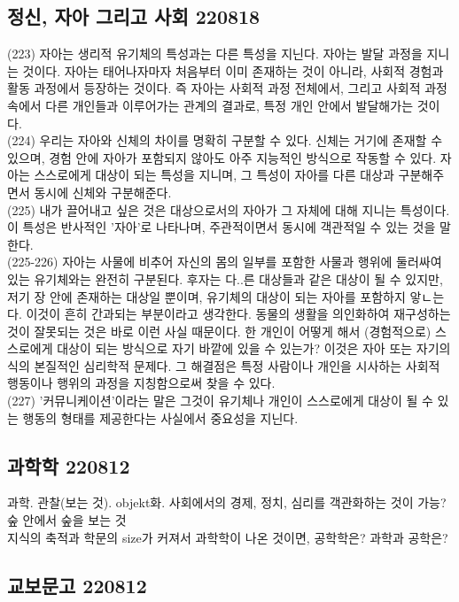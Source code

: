 \documentclass[11pt, a4paper]{article}
\begin{document}
\subsection{정신, 자아 그리고 사회 220818}
(223) 자아는 생리적 유기체의 특성과는 다른 특성을 지닌다. 자아는 발달 과정을 지니는 것이다. 자아는 태어나자마자 처음부터 이미 존재하는 것이 아니라, 사회적 경험과 활동 과정에서 등장하는 것이다. 즉 자아는 사회적 과정 전체에서, 그리고 사회적 과정 속에서 다른 개인들과 이루어가는 관계의 결과로, 특정 개인 안에서 발달해가는 것이다. \\
(224) 우리는 자아와 신체의 차이를 명확히 구분할 수 있다. 신체는 거기에 존재할 수 있으며, 경험 안에 자아가 포함되지 않아도 아주 지능적인 방식으로 작동할 수 있다. 자아는 스스로에게 대상이 되는 특성을 지니며, 그 특성이 자아를 다른 대상과 구분해주면서 동시에 신체와 구분해준다. \\
(225) 내가 끌어내고 싶은 것은 대상으로서의 자아가 그 자체에 대해 지니는 특성이다. 이 특성은 반사적인 '자아'로 나타나며, 주관적이면서 동시에 객관적일 수 있는 것을 말한다. \\
(225-226) 자아는 사물에 비추어 자신의 몸의 일부를 포함한 사물과 행위에 둘러싸여 있는 유기체와는 완전히 구분된다. 후자는 다..른 대상들과 같은 대상이 될 수 있지만, 저기 장 안에 존재하는 대상일 뿐이며, 유기체의 대상이 되는 자아를 포함하지 앟ㄴ는다. 이것이 흔히 간과되는 부분이라고 생각한다. 동물의 생활을 의인화하여 재구성하는 것이 잘못되는 것은 바로 이런 사실 때문이다. 한 개인이 어떻게 해서 (경험적으로) 스스로에게 대상이 되는 방식으로 자기 바깥에 있을 수 있는가? 이것은 자아 또는 자기의식의 본질적인 심리학적 문제다. 그 해결점은 특정 사람이나 개인을 시사하는 사회적 행동이나 행위의 과정을 지칭함으로써 찾을 수 있다. \\
(227) '커뮤니케이션'이라는 말은 그것이 유기체나 개인이 스스로에게 대상이 될 수 있는 행동의 형태를 제공한다는 사실에서 중요성을 지닌다.

\newpage
\subsection{과학학 220812}
과학. 관찰(보는 것). objekt화. 사회에서의 경제, 정치, 심리를 객관화하는 것이 가능? 숲 안에서 숲을 보는 것 \\

지식의 축적과 학문의 size가 커져서 과학학이 나온 것이면, 공학학은? 과학과 공학은? \\


\newpage
\subsection{교보문고 220812}
\end{document}
